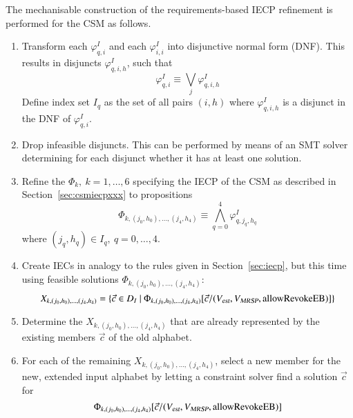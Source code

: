 The mechanisable construction of the requirements-based IECP refinement is performed
for the CSM  as follows.
\begin{enumerate}
\item Transform each $\varphi_{q,i}^I$ and each $\varphi_{i,i}^I$ into disjunctive normal form (DNF). This results in disjuncts $\varphi_{q,i,h}^I$, such that
$$
\varphi_{q,i}^I \equiv \bigvee_j \varphi_{q,i,h}^I
$$
Define index set $I_q$ as the set of all pairs $(i,h)$ where $\varphi_{q,i,h}^I$ is a disjunct in the DNF of $\varphi_{q,i}^I$.


\item Drop infeasible disjuncts. This can be performed by means of an SMT solver determining for each disjunct whether it has at least one solution.

\item Refine the $\Phi_k,\ k=1,\dots,6$ specifying the IECP of the CSM as 
described in Section~\ref{sec:csmiecpxxx} to propositions
$$
      \Phi_{k,(j_0,h_0),\dots,(j_4,h_4)} \equiv \bigwedge_{q=0}^4 \varphi_{q,j_q,h_q}^I
$$
where $(j_q,h_q)\in I_q,\ q = 0,\dots,4$.


\item Create IECs in analogy to the rules given in Section~\ref{sec:iecp}, but this time using feasible solutions $\Phi_{k,(j_0,h_0),\dots,(j_4,h_4)}$:
$$
X_{k,(j_0,h_0),\dots,(j_4,h_4)} = \{\vec c\in D_I~|~\Phi_{k,(j_0,h_0),\dots,(j_4,h_4)}[\vec c/({V_{\text{\sl est}}},{V_{\text{\sl MRSP}}},\text{allowRevokeEB})]\}
$$

\item Determine the $X_{k,(j_0,h_0),\dots,(j_4,h_4)}$ that are already represented by the existing members $\vec c$  of the old alphabet.

\item  For each of the remaining $X_{k,(j_0,h_0),\dots,(j_4,h_4)}$, select a new member for the new, extended input alphabet by letting a constraint solver find a solution $\vec c$ for 
$$\Phi_{k,(j_0,h_0),\dots,(j_4,h_4)}[\vec c/({V_{\text{\sl est}}},{V_{\text{\sl MRSP}}},\text{allowRevokeEB})]$$

\end{enumerate}

